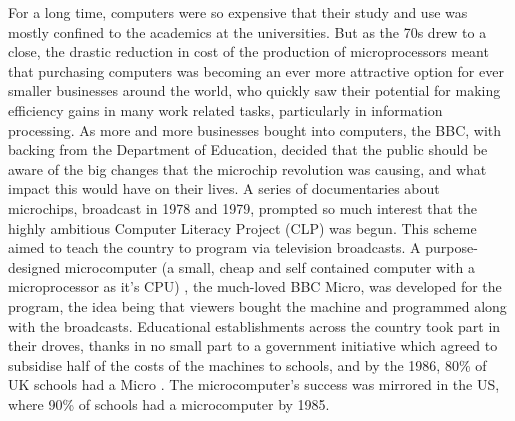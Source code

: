 \documentclass[ %
                    author={Jonathan Rankin},
                supervisor={Dr. David May, Dr. Ian Holyer},
                    degree={MEng},
                     title={CodeTouch},
                  subtitle={A Revolutionary Way To Program Real Code On Touch Screen Devices},
                      type={enterprise},
                      year={2015 } ]{dissertation}
\begin{document}
For a long time, computers were so expensive that their study and use was mostly confined to the academics at the universities. But as the 70s drew to a close, the drastic reduction in cost of the production of microprocessors meant that purchasing computers was becoming an ever more attractive option for ever smaller businesses around the world, who quickly saw their potential for making efficiency gains in many work related tasks, particularly in information processing. As more and more businesses bought into computers, the BBC, with backing from the Department of Education, decided that the public should be aware of the big changes that the microchip revolution was causing, and what impact this would have on their lives. A series of documentaries about microchips, broadcast in 1978 and 1979, prompted so much interest that the highly ambitious Computer Literacy Project (CLP) was begun. This scheme aimed to teach the country to program via television broadcasts. A purpose-designed microcomputer (a small, cheap and self contained computer with a microprocessor as it's CPU) , the much-loved BBC Micro, was developed for the program, the idea being that viewers bought the machine and programmed along with the broadcasts. Educational establishments across the country took part in their droves, thanks in no small part to a government initiative which agreed to subsidise half of the costs of the machines to schools, and by the 1986, 80\% of UK schools had a Micro \cite{IIfASA}. The microcomputer's success was mirrored in the US, where 90\% of schools had a microcomputer by 1985\cite{IIfASA}.
\end{document}
